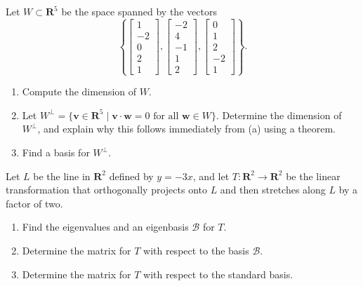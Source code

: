 \documentclass[11pt,twoside,openany]{memoir}
\begin{document}
        \begin{exercise}
        Let $W\subset \mathbf{R}^5$ be the space spanned by the vectors
        \[
        \left\{\begin{bmatrix} 1 \\ -2 \\ 0 \\ 2 \\ 1 \end{bmatrix},\begin{bmatrix} -2 \\ 4 \\ -1 \\ 1 \\ 2\end{bmatrix}, \begin{bmatrix} 0 \\ 1 \\ 2 \\ -2 \\1\end{bmatrix}\right\}.\]

        \begin{enumerate}[label=(\alph*)]
            \item Compute the dimension of $W$.
            \item Let $W^{\perp}=\{\mathbf{v}\in \mathbf{R}^5\mid \mathbf{v}\cdot \mathbf{w}=0 \text{ for all } \mathbf{w}\in W\}$. Determine the dimension of $W^{\perp}$, and explain why this follows immediately from (a) using a theorem.
            \item Find a basis for $W^{\perp}$.
        \end{enumerate}
        \end{exercise}
        
        \begin{exercise}
        Let $L$ be the line in $\mathbf{R}^2$ defined by $y=-3x$, and let $T:\mathbf{R}^2\to \mathbf{R}^2$ be the linear transformation that orthogonally projects onto $L$ and then stretches along $L$ by a factor of two.
        \begin{enumerate}[label=(\alph*)]
            \item Find the eigenvalues and an eigenbasis $\mathcal{B}$ for $T$.
            \item Determine the matrix for $T$ with respect to the basis $\mathcal{B}$.
            \item Determine the matrix for $T$ with respect to the standard basis.
        \end{enumerate}
        \end{exercise}
        
\end{document}
